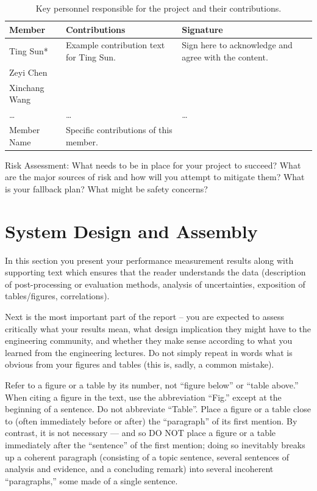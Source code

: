 \documentclass{engr1000j-s2} %
\begin{document}
  \begin{table}[!ht]
    \centering
    \caption{\quad Key personnel responsible for the project and their contributions.}
    \begin{tabular}{p{} p{} p{}}
      \toprule Member & Contributions & Signature \\
      \midrule Ting Sun* & Example contribution text for Ting Sun. & Sign here to acknowledge and agree with the content. \\
      Zeyi Chen &  &  \\
      Xinchang Wang &  &  \\
      \dots & \dots & \dots \\
      Member Name & Specific contributions of this member. &  \\
      \bottomrule
    \end{tabular}
    \label{tab:personnel}
  \end{table}

  Risk Assessment: What needs to be in place for your project to succeed? What
  are the major sources of risk and how will you attempt to mitigate them? What is
  your fallback plan? What might be safety concerns?

  \hspace{1em}
  
  \section{System Design and Assembly}
  In this section you present your performance measurement results along with supporting text which ensures that the reader understands the data (description of post-processing or evaluation methods, analysis of uncertainties, exposition of tables/figures, correlations). 
  
  Next is the most important part of the report – you are expected to assess critically what your results mean, what design implication they might have to the engineering community, and whether they make sense according to what you learned from the engineering lectures. Do not simply repeat in words what is obvious from your figures and tables (this is, sadly, a common mistake). 

  Refer to a figure or a table by its number, not “figure below” or “table above.” When citing a figure in the text, use the abbreviation “Fig.” except at the beginning of a sentence. Do not abbreviate “Table”.  Place a figure or a table close to (often immediately before or after) the “paragraph” of its first mention. By contrast, it is not necessary --- and so DO NOT place a figure or a table immediately after the “sentence” of the first mention; doing so inevitably breaks up a coherent paragraph (consisting of a topic sentence, several sentences of analysis and evidence, and a concluding remark) into several incoherent “paragraphs,” some made of a single sentence.
  
\end{document}
